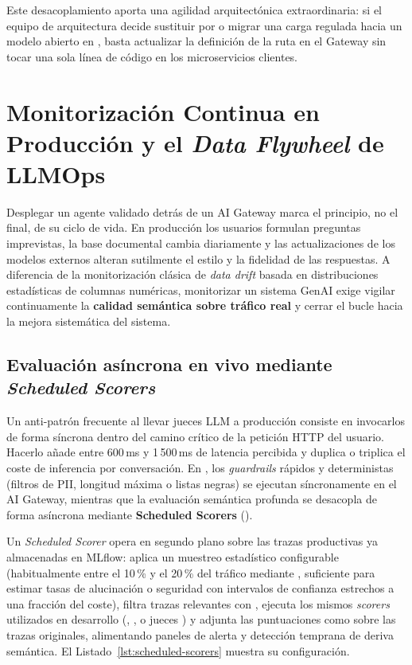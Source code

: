 Este desacoplamiento aporta una agilidad arquitectónica extraordinaria: si el equipo de arquitectura decide sustituir  por  o migrar una carga regulada hacia un modelo abierto en , basta actualizar la definición de la ruta en el Gateway sin tocar una sola línea de código en los microservicios clientes.

\section[Monitorización y Data Flywheel]{Monitorización Continua en Producción y el \textit{Data Flywheel} de LLMOps}\label{sec:llmops-flywheel}

Desplegar un agente validado detrás de un AI Gateway marca el principio, no el final, de su ciclo de vida. En producción los usuarios formulan preguntas imprevistas, la base documental cambia diariamente y las actualizaciones de los modelos externos alteran sutilmente el estilo y la fidelidad de las respuestas. A diferencia de la monitorización clásica de \textit{data drift} basada en distribuciones estadísticas de columnas numéricas, monitorizar un sistema GenAI exige vigilar continuamente la \textbf{calidad semántica sobre tráfico real} y cerrar el bucle hacia la mejora sistemática del sistema.

\subsection{Evaluación asíncrona en vivo mediante \textit{Scheduled Scorers}}\label{subsec:scheduled-scorers}

Un anti-patrón frecuente al llevar jueces LLM a producción consiste en invocarlos de forma síncrona dentro del camino crítico de la petición HTTP del usuario. Hacerlo añade entre 600\,ms y 1\,500\,ms de latencia percibida y duplica o triplica el coste de inferencia por conversación. En , los \textit{guardrails} rápidos y deterministas (filtros de PII, longitud máxima o listas negras) se ejecutan síncronamente en el AI Gateway, mientras que la evaluación semántica profunda se desacopla de forma asíncrona mediante \textbf{Scheduled Scorers} ().

Un \textit{Scheduled Scorer} opera en segundo plano sobre las trazas productivas ya almacenadas en MLflow: aplica un muestreo estadístico configurable (habitualmente entre el 10\,\% y el 20\,\% del tráfico mediante , suficiente para estimar tasas de alucinación o seguridad con intervalos de confianza estrechos a una fracción del coste), filtra trazas relevantes con , ejecuta los mismos \textit{scorers} utilizados en desarrollo (, ,  o jueces ) y adjunta las puntuaciones como  sobre las trazas originales, alimentando paneles de alerta y detección temprana de deriva semántica. El Listado~\ref{lst:scheduled-scorers} muestra su configuración.

